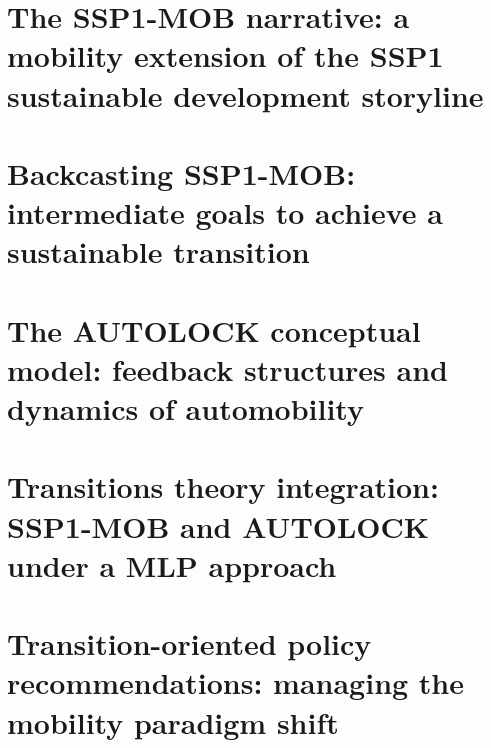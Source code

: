 \section[The SSP1-MOB narrative]{The SSP1-MOB narrative: a mobility extension of the SSP1 sustainable development storyline}
\label{s:results:ssp1-mob}


\section[Backcasting SSP1-MOB]{Backcasting SSP1-MOB: intermediate goals to achieve a sustainable transition}
\label{s:results:backcasting-ssp1-mob}


\section[The AUTOLOCK conceptual model]{The AUTOLOCK conceptual model: feedback structures and dynamics of automobility}
\label{s:results:autolock-model}


\section[Transitions theory integration]{Transitions theory integration: SSP1-MOB and AUTOLOCK under a MLP approach}
\label{s:results:characterizing-transition}


\section[Transition-oriented policy recommendations]{Transition-oriented policy recommendations: managing the mobility paradigm shift}
\label{s:results:policy-recommendations}
